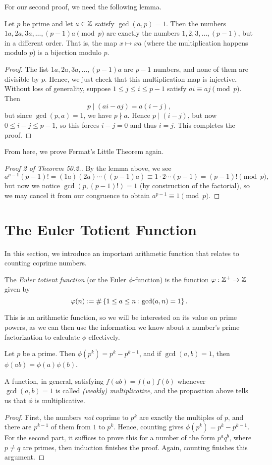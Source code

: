 \documentclass{article}
\begin{document}
For our second proof, we need the following lemma.
\begin{lemma}\label{50.2 in text}
Let $p$ be prime and let $a\in \mathbb Z$ satisfy $\gcd(a,p) = 1$. Then the numbers $1a, 2a, 3a, \ldots, (p-1)a \pmod p$ are exactly the numbers $1, 2, 3, \ldots, (p-1)$, but in a different order. That is, the map $x \mapsto xa$ (where the multiplication happens modulo $p$) is a bijection modulo $p$.
\end{lemma}
\begin{proof}
The list $1a, 2a, 3a, \ldots, (p-1)a$ are $p-1$ numbers, and none of them are divisible by $p$. Hence, we just check that this multiplication map is injective. Without loss of generality, suppose $1\leq  j\leq i\leq p-1$ satisfy $ai \equiv aj\pmod p$. Then $$p\mid (ai-aj) = a(i-j),$$\newpage but since $\gcd(p,a) = 1$, we have $p\nmid a$. Hence $p\mid (i-j)$, but now $0 \leq i-j \leq p-1$, so this forces $i-j = 0$ and thus $i=j$. This completes the proof.
\end{proof}

From here, we prove Fermat's Little Theorem again.
\begin{proof}[Proof 2 of Theorem 50.2.]
By the lemma above, we see 
$$a^{p-1}(p-1)!  = (1a)(2a)\cdots ((p-1)a) \equiv 1\cdot 2\cdots (p-1) = (p-1)! \pmod p,$$
but now we notice $\gcd(p, (p-1)!) = 1$ (by construction of the factorial), so we may cancel it from our congruence to obtain $a^{p-1}\equiv 1\pmod p$.
\end{proof}

\setcounter{section}{62}
\section{The Euler Totient Function}
In this section, we introduce an important arithmetic function that relates to counting coprime numbers.
\begin{definition}
The \textit{Euler totient function} (or the Euler $\phi$-function) is the function $\varphi: \mathbb Z^+ \to \mathbb Z$ given by
$$\varphi(n) := \#\left\{1 \leq a \leq n: \gcd(a, n) = 1\right\}.$$
\end{definition}

This is an arithmetic function, so we will be interested on its value on prime powers, as we can then use the information we know about a number's prime factorization to calculate $\phi$ effectively.
\begin{proposition}
Let $p$ be a prime. Then $\phi(p^k) = p^k - p^{k-1}$, and if $\gcd(a,b) = 1$, then $\phi(ab) = \phi(a)\phi(b)$.
\end{proposition}
A function, in general, satisfying $f(ab) = f(a)f(b)$ whenever $\gcd(a,b) = 1$ is called \textit{(weakly) multiplicative}, and the proposition above tells us that $\phi$ is multiplicative.
\begin{proof}
First, the numbers \textit{not} coprime to $p^k$ are exactly the multiples of $p$, and there are $p^{k-1}$ of them from $1$ to $p^k$. Hence, counting gives $\phi(p^k) = p^k - p^{k-1}$. For the second part, it suffices to prove this for a number of the form $p^aq^b$, where $p\neq q$ are primes, then induction finishes the proof. Again, counting finishes this argument.
\end{proof}
\end{document}

